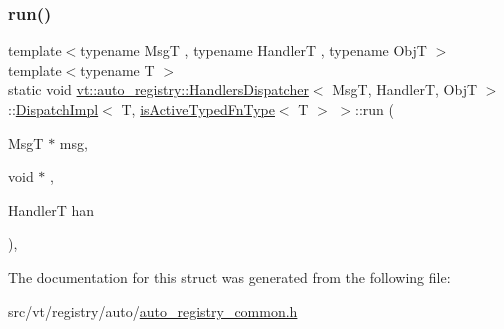 \subsubsection{\texorpdfstring{run()}{run()}}
{\footnotesize\ttfamily template$<$typename MsgT , typename HandlerT , typename ObjT $>$ \\
template$<$typename T $>$ \\
static void \hyperlink{structvt_1_1auto__registry_1_1_handlers_dispatcher}{vt\+::auto\+\_\+registry\+::\+Handlers\+Dispatcher}$<$ MsgT, HandlerT, ObjT $>$\+::\hyperlink{structvt_1_1auto__registry_1_1_handlers_dispatcher_1_1_dispatch_impl}{Dispatch\+Impl}$<$ T, \hyperlink{structvt_1_1auto__registry_1_1_handlers_dispatcher_ac15d047eb387381db2612c79e196f8e7}{is\+Active\+Typed\+Fn\+Type}$<$ T $>$ $>$\+::run (\begin{DoxyParamCaption}\item[{MsgT $\ast$}]{msg,  }\item[{void $\ast$}]{,  }\item[{HandlerT}]{han }\end{DoxyParamCaption})\hspace{0.3cm}{\ttfamily [inline]}, {\ttfamily [static]}}



The documentation for this struct was generated from the following file\+:\begin{DoxyCompactItemize}
\item 
src/vt/registry/auto/\hyperlink{auto__registry__common_8h}{auto\+\_\+registry\+\_\+common.\+h}\end{DoxyCompactItemize}
